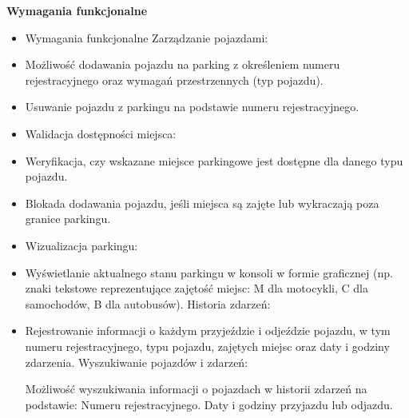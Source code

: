 \noindent \textbf{Wymagania funkcjonalne}
\begin{itemize}
    \item Wymagania funkcjonalne
Zarządzanie pojazdami:

\item Możliwość dodawania pojazdu na parking z określeniem numeru rejestracyjnego oraz wymagań przestrzennych (typ pojazdu).
\item Usuwanie pojazdu z parkingu na podstawie numeru rejestracyjnego.
\item Walidacja dostępności miejsca:

\item Weryfikacja, czy wskazane miejsce parkingowe jest dostępne dla danego typu pojazdu.
\item Blokada dodawania pojazdu, jeśli miejsca są zajęte lub wykraczają poza granice parkingu.
\item Wizualizacja parkingu:

\item Wyświetlanie aktualnego stanu parkingu w konsoli w formie graficznej (np. znaki tekstowe reprezentujące zajętość miejsc: M dla motocykli, C dla samochodów, B dla autobusów).
Historia zdarzeń:

\item Rejestrowanie informacji o każdym przyjeździe i odjeździe pojazdu, w tym numeru rejestracyjnego, typu pojazdu, zajętych miejsc oraz daty i godziny zdarzenia.
Wyszukiwanie pojazdów i zdarzeń:

Możliwość wyszukiwania informacji o pojazdach w historii zdarzeń na podstawie:
Numeru rejestracyjnego.
Daty i godziny przyjazdu lub odjazdu.

\end{itemize}


